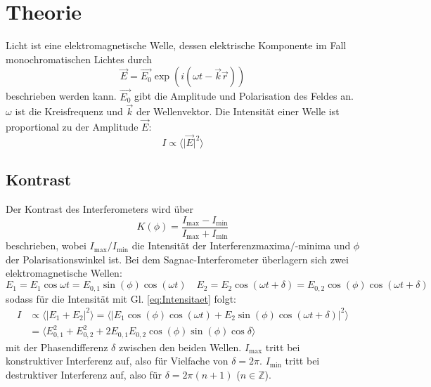 \section{Theorie}
\label{sec:Theorie}

Licht ist eine elektromagnetische Welle, 
dessen elektrische Komponente im Fall monochromatischen Lichtes durch
\begin{equation}
  \label{eq:Welle}
  \vec{E}=\vec{E_0}\exp{\left(i (\omega t-\vec{k}\vec{r})\right)}
\end{equation}
beschrieben werden kann. 
$\vec{E_0}$ gibt die Amplitude und Polarisation des Feldes
an.
$\omega$ ist die Kreisfrequenz und  $\vec{k}$ der Wellenvektor.
Die Intensität einer Welle ist proportional zu der Amplitude $\vec{E}$:
\begin{equation}
  \label{eq:Intensitaet}
  I \propto \langle \lvert \vec{E} \rvert^2 \rangle
\end{equation} 


\subsection{Kontrast}%
Der Kontrast des Interferometers wird über 
\begin{equation}
  K(\phi)= \frac{I_{\text{max}}-I_{\text{min}}}{I_{\text{max}}+I_{\text{min}}}
  \label{eq:Kontrast}
\end{equation}
beschrieben, 
wobei $I_{\text{max}} / I_{\text{min}}$ die Intensität der Interferenzmaxima/-minima 
und $\phi$ der Polarisationswinkel ist. 
\newline \newline
\noindent Bei dem Sagnac-Interferometer überlagern sich zwei elektromagnetische Wellen:
\begin{equation}
  E_1 = E_{1} \cos{\omega t} = E_{0,1} \sin(\phi) \cos{(\omega t)} \quad 
  E_2 = E_{2} \cos{(\omega t + \delta) } =E_{0,2} \cos(\phi)  \cos{(\omega t + \delta) } 
\end{equation}
\noindent sodass für die Intensität mit Gl. \eqref{eq:Intensitaet} folgt:
\begin{align}
  I &\propto \langle \lvert
  E_1+E_2 \rvert^2 \rangle =
  \langle \lvert E_1 \cos{(\phi)}\cos{(\omega t)} + E_2 \sin{(\phi)}\cos{(\omega t + \delta)} \rvert^2 \rangle \\
  &=  \langle E_{0,1}^2 + E_{0,2}^2 + 2E_{0,1}E_{0,2}\cos(\phi)\sin(\phi)\cos{\delta}  \rangle
\end{align}
mit der Phasendifferenz $\delta$ zwischen den beiden Wellen.
$I_{\text{max}}$ tritt bei konstruktiver Interferenz auf,
also für Vielfache von $\delta = 2\pi$.
$I_{\text{min}}$ tritt bei destruktiver Interferenz auf,
also für $\delta = 2\pi(n+1)$ ($n \in \mathbb{Z} $).

